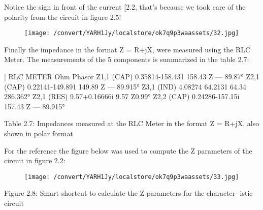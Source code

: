 \documentclass[12pt]{report}
\begin{document}
    Notice the sign in front of the current [2.2, that’s because we took care of  the polarity from the circuit in figure 2.5! 

\vspace{10pt}

\begin{figure}[h]

\texttt{[image: /convert/YARH1Jy/localstore/ok7q9p3waassets/32.jpg]}

\centering

\end{figure}

\par

\vspace{10pt}

    Finally the impedance in the format Z = R+jX, were measured using the  RLC Meter. The measurements of the 5 components is summarized in the  table 2.7: 

\vspace{10pt}

         | RLC METER Ohm Phasor         Z1,1 (CAP) 0.35814-158.431 158.43 Z — 89.87°  Z2,1 (CAP) 0.22141-149.891 149.89 Z — 89.915°  Z3,1 (IND) 4.08274 64.2131 64.34 286.362°  Z2,1 (RES) 9.57+0.16666i 9.57 Z0.99°   Z2,2 (CAP) 0.24286-157.15i 157.43 Z — 89.915°     

\vspace{10pt}

    Table 2.7: Impedances measured at the RLC Meter in the format Z = R+jX,  also shown in polar format 

\vspace{10pt}

    For the reference the figure below was used to compute the Z parameters of  the circuit in figure 2.2: 

\vspace{10pt}

\begin{figure}[h]

\texttt{[image: /convert/YARH1Jy/localstore/ok7q9p3waassets/33.jpg]}

\centering

\end{figure}

    Figure 2.8: Smart shortcut to calculate the Z parameters for the character-  istic circuit 

\vspace{10pt}
\end{document}
